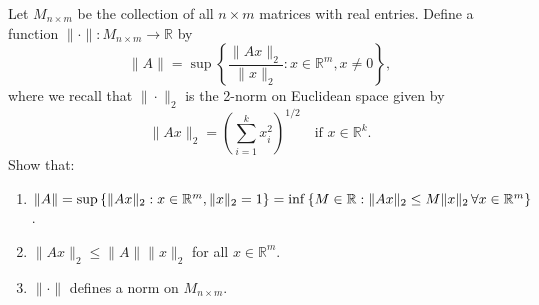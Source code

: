 \documentclass{report}
\begin{document}
\begin{question}{}{}
Let $M_{n \times m}$ be the collection of all $n \times m$ matrices with real entries. Define a function $\| \cdot \|: M_{n \times m} \to \mathbb{R}$ by
\[
\| A \| = \sup \left\{ \frac{\|Ax\|_2}{\|x\|_2} : x \in \mathbb{R}^m, x \neq 0 \right\},
\]
where we recall that $\| \cdot \|_2$ is the 2-norm on Euclidean space given by
\[
\| Ax \|_2 = \left( \sum_{i=1}^{k} x_i^2 \right)^{1/2} \quad \text{if } x \in \mathbb{R}^k.
\]
Show that:
\begin{enumerate}
    \item $\| A \| = \sup \left\{ \|Ax\|_2 : x \in \mathbb{R}^m, \| x \|_2 =1 \right\} = \inf \left\{ M \in \mathbb{R} : \|Ax\|_2 \leq M \|x\|_2 \, \forall x \in \mathbb{R}^m \right\}$.
    \item $\| Ax \|_2 \leq \| A \| \| x \|_2$ for all $x \in \mathbb{R}^m$.
    \item $\| \cdot \|$ defines a norm on $M_{n \times m}$.
\end{enumerate}
\end{question}
\end{document}
